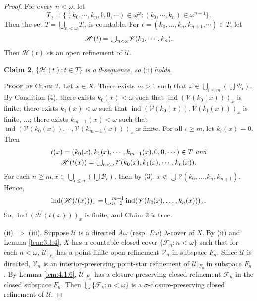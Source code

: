 \documentclass[main.tex]{subfiles}
\begin{document}
\begin{proof}
For every $n < \omega$, let 
$$T_n = \{(k_0, \cdots, k_n, 0, 0, \cdots) \in \omega^\omega: (k_0, \cdots, k_n) \in \omega^{n+1}\}.$$ 
Then the set $T = \bigcup_{n<\omega} T_n$ is countable. 
For $t = (k_0, \dots, k_n, k_{n+1}, \cdots) \in T$, let 
$$\mathscr{H}(t) = \raisebox{-2pt}{\scalebox{1.5}{$\cup$}}_{n<\omega} \mathscr{V}(k_0,\cdots, k_n).$$ 
Then $\mathscr{H}(t)$ sis an open refinement of $\mathscr{U}$.

\textbf{Claim 2}. $\{\mathscr{H}(t): t \in T\}$ \textit{ is a  $\theta$-sequence, so} (ii) \textit{ holds}.

\textsc{Proof of Claim 2}. Let $x \in X$. There exists $m > 1$ such that 
$x \in \bigcup_{i \le m}(\bigcup \mathscr{B}_i)$. By Condition (4), there exists $k_0(x)<\omega$ 
such that $\operatorname{ind}(\mathscr{V}(k_0(x)))_x$ is finite; there exists $k_1(x) <\omega$ 
such that $\operatorname{ind}(\mathscr{V}(k_0(x)), \mathscr{V}(k_1(x)))_x$ is finite, $\dots$; 
there exists $k_{m-1}(x) <\omega$ 
such that $\operatorname{ind}(\mathscr{V}(k_0(x)), \cdots,  \mathscr{V}(k_{m-1}(x)))_x$ is finite. 
For all $i \ge m$, let $k_i(x) = 0$.  Then
\begin{gather*}
	t(x)=(k_0(x), k_1(x), \cdots, k_{m-1}(x), 0, 0, \cdots) \in T \textit{ and} \\
	\mathscr{H}(t(x)) = \raisebox{-2pt}{\scalebox{1.5}{$\cup$}}_{n<\omega}\mathscr{V}(k_0(x), k_1(x), \cdots, k_{n}(x)).
\end{gather*}
For each $n \ge m, x \in \bigcup_{i\le n}(\bigcup \mathscr{B}_i)$, then by (3), 
$x \notin \bigcup \mathscr{V}(k_0, \dots, k_n, k_{n+1})$. 
Hence, 
$$\operatorname{ind}(\mathscr{H}(t(x)))_x = 
\raisebox{-2pt}{\scalebox{1.5}{$\cup$}}_{n=0}^{m-1}\operatorname{ind}(\mathscr{V}(k_0(x), \dots, k_n(x)))_x.$$
So, $\operatorname{ind}(\mathscr{H}(t(x)))_x$ is finite, and  Claim 2  is true. 

(ii) $\Rightarrow$ (iii). Suppose $\mathscr{U}$ is a directed $A\omega$ (resp. $D\omega$)
$\lambda$-cover of $X$. By (ii) and Lemma \ref{lem:3.1.4},  $X$ has a
countable closed cover $\{\mathscr{F}_n: n <\omega\}$ such that for each $n < \omega$,
$\mathscr{U}|_{F_n}$ has a point-finite open refinement $\mathscr{V}_n$ in subspace $F_n$. 
Since $\mathscr{U}$ is directed, $\mathscr{V}_n$ is an interior-preserving point-star refinement of 
$\mathscr{U}\vert{}_{F_n}$ in subspace $F_n$. By Lemma \ref{lem:4.1.6}, 
$\mathscr{U}\vert{}_{F_n}$ has a closure-preserving closed refinement $\mathscr{F}_n$ in the closed subspace $F_n$. Then $\bigcup\{\mathscr{F}_n: n<\omega\}$ is a $\sigma$-closure-preserving 
closed refinement of $\mathscr{U}$.


\end{proof}
\end{document}

